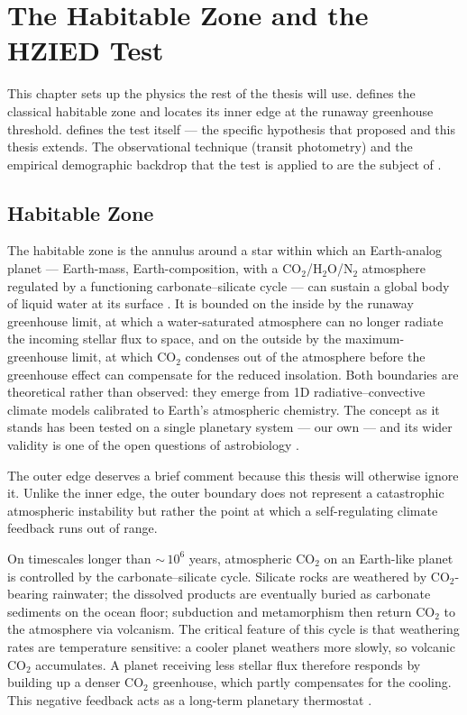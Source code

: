\chapter{The Habitable Zone and the HZIED Test}
\label{chap:exoplanet_characterization}

This chapter sets up the physics the rest of the thesis will use.
 defines the classical habitable zone and
locates its inner edge at the runaway greenhouse threshold.
 defines the \HZIED test itself --- the
specific hypothesis that \textcite{Schlecker2024} proposed and this
thesis extends.  The observational technique (transit photometry)
and the empirical demographic backdrop that the test is applied to
are the subject of .


\section{Habitable Zone}
\label{sec:habitable_zone}

The habitable zone is the annulus around a star within which an
Earth-analog planet --- Earth-mass, Earth-composition, with a
CO$_2$/H$_2$O/N$_2$ atmosphere regulated by a functioning
carbonate--silicate cycle --- can sustain a global body of liquid water
at its surface \parencite{Kasting1993,Kopparapu2013}.  It is bounded
on the inside by the runaway greenhouse limit, at which a
water-saturated atmosphere can no longer radiate the incoming stellar
flux to space, and on the outside by the maximum-greenhouse limit, at
which CO$_2$ condenses out of the atmosphere before the greenhouse
effect can compensate for the reduced insolation.  Both boundaries
are theoretical rather than observed: they emerge from 1D
radiative--convective climate models calibrated to Earth's atmospheric
chemistry.  The concept as it stands has been tested on a single
planetary system --- our own --- and its wider validity is one of the
open questions of astrobiology \parencite{CatlingZahnle2020}.

The outer edge deserves a brief comment because this thesis will
otherwise ignore it.  Unlike the inner edge, the outer boundary does
not represent a catastrophic atmospheric instability but rather the
point at which a self-regulating climate feedback runs out of range.

On timescales longer than ${\sim}\,10^6$ years, atmospheric
CO$_2$ on an Earth-like planet is controlled by the
carbonate--silicate cycle.  Silicate rocks are weathered by
CO$_2$-bearing rainwater; the dissolved products are eventually buried
as carbonate sediments on the ocean floor; subduction and metamorphism
then return CO$_2$ to the atmosphere via volcanism.  The critical
feature of this cycle is that weathering rates are temperature
sensitive: a cooler planet weathers more slowly, so volcanic CO$_2$
accumulates.  A planet receiving less stellar flux therefore responds
by building up a denser CO$_2$ greenhouse, which partly compensates
for the cooling.  This negative feedback acts as a long-term planetary
thermostat \parencite{Kasting1993}.

